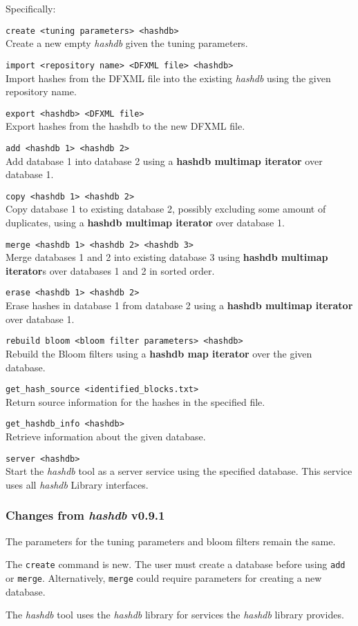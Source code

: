 \documentclass[12pt,twoside]{article}
\newcommand{\hdb}{\emph{hashdb}\xspace}
\newcommand{\hmi}{\textbf{hashdb map iterator}\xspace}
\newcommand{\hmmi}{\textbf{hashdb multimap iterator}\xspace}
\begin{document}
Specifically:
\begin{compactitem}
\item \texttt{create <tuning parameters> <hashdb>} \\
Create a new empty \hdb given the tuning parameters.
\item \texttt{import <repository name> <DFXML file> <hashdb>} \\
Import hashes from the DFXML file into the existing \hdb
using the given repository name.
\item \texttt{export <hashdb> <DFXML file>} \\
Export hashes from the hashdb to the new DFXML file.
\item \texttt{add <hashdb 1> <hashdb 2>} \\
Add database 1 into database 2
using a \hmmi over database 1.
\item \texttt{copy <hashdb 1> <hashdb 2>} \\
Copy database 1 to existing database 2,
possibly excluding some amount of duplicates,
using a \hmmi over database 1.
\item \texttt{merge <hashdb 1> <hashdb 2> <hashdb 3>} \\
Merge databases 1 and 2 into existing database 3
using {\hmmi}s over databases 1 and 2 in sorted order.
\item \texttt{erase <hashdb 1> <hashdb 2>} \\
Erase hashes in database 1 from database 2
using a \hmmi over database 1.
\item \texttt{rebuild bloom <bloom filter parameters> <hashdb>} \\
Rebuild the Bloom filters
using a \hmi over the given database.
\item \texttt{get\_hash\_source <identified\_blocks.txt>} \\
Return source information for the hashes in the specified file.
\item \texttt{get\_hashdb\_info <hashdb>} \\
Retrieve information about the given database.
\item \texttt{server <hashdb>} \\
Start the \hdb tool as a server service using the specified database.
This service uses all \hdb Library interfaces.
\end{compactitem}

\subsubsection{Changes from \hdb v0.9.1}
\begin{compactitem}
\item The parameters for the tuning parameters and bloom filters
remain the same.
\item The \texttt{create} command is new.
The user must create a database before using \texttt{add} or \texttt{merge}.
Alternatively, \texttt{merge} could require parameters for creating
a new database.
\item The \hdb tool uses the \hdb library
for services the \hdb library provides.
\end{compactitem}
\end{document}
